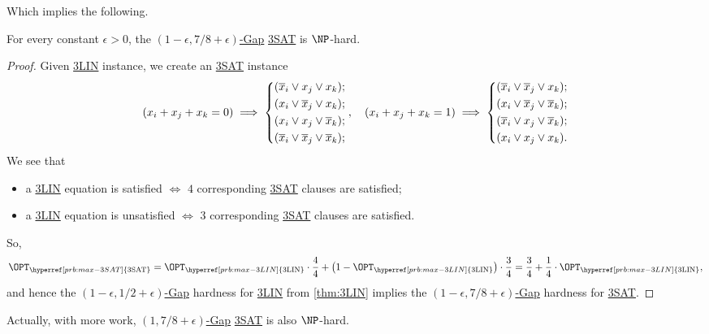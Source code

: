 Which implies the following.

\begin{corollary}
	For every constant \(\epsilon > 0\), the \hyperref[def:c-s-Gap]{\((1-\epsilon , 7 / 8 + \epsilon )\)-Gap} \hyperref[prb:max-3SAT]{3SAT} is \(\NP\)-hard.
\end{corollary}
\begin{proof}
	Given \hyperref[prb:max-3LIN]{3LIN} instance, we create an \hyperref[prb:max-3SAT]{3SAT} instance
	\[
		(x_i + x_j + x_k = 0) \implies \begin{dcases}
			(\overline{x} _i \lor x_j \lor x_k);   \\
			(x _i \lor \overline{x} _j \lor x_k);  \\
			(x _i \lor x _j \lor \overline{x} _k); \\
			(\overline{x} _i \lor \overline{x} _j \lor \overline{x} _k);
		\end{dcases},\quad
		(x_i + x_j + x_k = 1) \implies \begin{dcases}
			(\overline{x} _i \lor \overline{x} _j \lor x_k);   \\
			(x _i \lor \overline{x} _j \lor \overline{x} _k);  \\
			(\overline{x}  _i \lor x _j \lor \overline{x} _k); \\
			(x_i \lor x _j \lor x _k).
		\end{dcases}
	\]
	We see that
	\begin{itemize}
		\item a \hyperref[prb:max-3LIN]{3LIN} equation is satisfied \(\iff \) \(4\) corresponding \hyperref[prb:max-3SAT]{3SAT} clauses are satisfied;
		\item a \hyperref[prb:max-3LIN]{3LIN} equation is unsatisfied \(\iff \) \(3\) corresponding \hyperref[prb:max-3SAT]{3SAT} clauses are satisfied.
	\end{itemize}
	So,
	\[
		\OPT_{\hyperref[prb:max-3SAT]{\text{3SAT}}}
		= \OPT_{\hyperref[prb:max-3LIN]{\text{3LIN}}} \cdot \frac{4}{4} + \left( 1 - \OPT_{\hyperref[prb:max-3LIN]{\text{3LIN}}} \right) \cdot \frac{3}{4}
		= \frac{3}{4} + \frac{1}{4}\cdot \OPT_{\hyperref[prb:max-3LIN]{\text{3LIN}}},
	\]
	and hence the \hyperref[def:c-s-Gap]{\((1 - \epsilon , 1 / 2 + \epsilon )\)-Gap} hardness for \hyperref[prb:max-3LIN]{3LIN} from \autoref{thm:3LIN} implies the \hyperref[def:c-s-Gap]{\((1-\epsilon , 7 / 8 + \epsilon )\)-Gap} hardness for \hyperref[prb:max-3SAT]{3SAT}.
\end{proof}

\begin{remark}
	Actually, with more work, \hyperref[def:c-s-Gap]{\((1 , 7 / 8 + \epsilon )\)-Gap} \hyperref[prb:max-3SAT]{3SAT} is also \(\NP\)-hard.
\end{remark}

